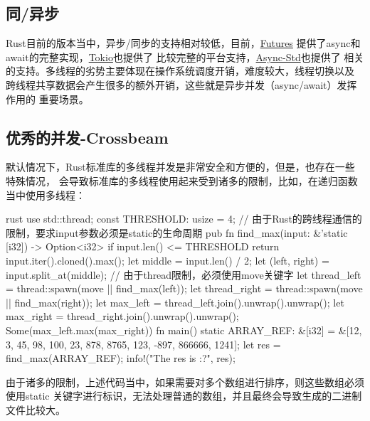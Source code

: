 \subsection{同/异步}
Rust目前的版本当中，异步/同步的支持相对较低，目前，\href{https://github.com/rust-lang/futures-rs}{Futures}
提供了async和await的完整实现，\href{https://github.com/tokio-rs/tokio}{Tokio}也提供了
比较完整的平台支持，\href{https://github.com/async-rs/async-std}{Async-Std}也提供了
相关的支持。多线程的劣势主要体现在操作系统调度开销，难度较大，线程切换以及
跨线程共享数据会产生很多的额外开销，这些就是异步并发（async/await）发挥作用的
重要场景。

\subsection{优秀的并发-Crossbeam}
默认情况下，Rust标准库的多线程并发是非常安全和方便的，但是，也存在一些特殊情况，
会导致标准库的多线程使用起来受到诸多的限制，比如，在递归函数当中使用多线程：
\begin{code-block}{rust}
use std::thread;
const THRESHOLD: usize = 4;
// 由于Rust的跨线程通信的限制，要求input参数必须是static的生命周期
pub fn find_max(input: &'static [i32]) -> Option<i32> {
    if input.len() <= THRESHOLD {
        return input.iter().cloned().max();
    }
    let middle = input.len() / 2;
    let (left, right) = input.split_at(middle);
    // 由于thread限制，必须使用move关键字
    let thread_left = thread::spawn(move || find_max(left));
    let thread_right = thread::spawn(move || find_max(right));
    let max_left = thread_left.join().unwrap().unwrap();
    let max_right = thread_right.join().unwrap().unwrap();
    Some(max_left.max(max_right))
}
fn main() {
    static ARRAY_REF: &[i32] = &[12, 3, 45, 98, 100, 23, 878, 8765, 123, -897, 866666, 1241];
    let res = find_max(ARRAY_REF);
    info!("The res is {:?}", res);
}
\end{code-block}
由于诸多的限制，上述代码当中，如果需要对多个数组进行排序，则这些数组必须使用static
关键字进行标识，无法处理普通的数组，并且最终会导致生成的二进制文件比较大。

